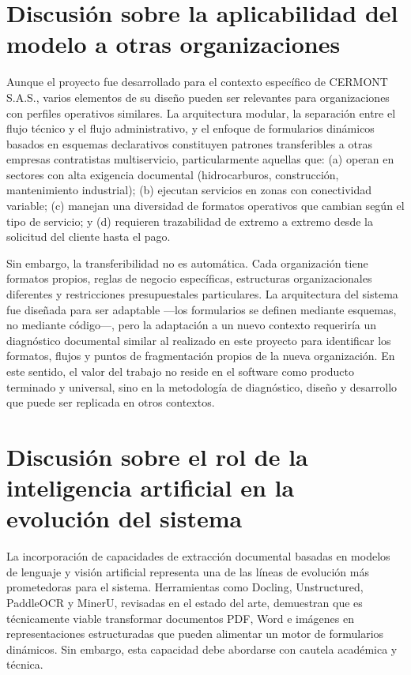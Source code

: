 \section{Discusión sobre la aplicabilidad del modelo a otras organizaciones}
\label{sec:discusion-aplicabilidad}

Aunque el proyecto fue desarrollado para el contexto específico de CERMONT S.A.S., varios elementos de su diseño pueden ser relevantes para organizaciones con perfiles operativos similares. La arquitectura modular, la separación entre el flujo técnico y el flujo administrativo, y el enfoque de formularios dinámicos basados en esquemas declarativos constituyen patrones transferibles a otras empresas contratistas multiservicio, particularmente aquellas que: (a) operan en sectores con alta exigencia documental (hidrocarburos, construcción, mantenimiento industrial); (b) ejecutan servicios en zonas con conectividad variable; (c) manejan una diversidad de formatos operativos que cambian según el tipo de servicio; y (d) requieren trazabilidad de extremo a extremo desde la solicitud del cliente hasta el pago.

Sin embargo, la transferibilidad no es automática. Cada organización tiene formatos propios, reglas de negocio específicas, estructuras organizacionales diferentes y restricciones presupuestales particulares. La arquitectura del sistema fue diseñada para ser adaptable —los formularios se definen mediante esquemas, no mediante código—, pero la adaptación a un nuevo contexto requeriría un diagnóstico documental similar al realizado en este proyecto para identificar los formatos, flujos y puntos de fragmentación propios de la nueva organización. En este sentido, el valor del trabajo no reside en el software como producto terminado y universal, sino en la metodología de diagnóstico, diseño y desarrollo que puede ser replicada en otros contextos.

\section{Discusión sobre el rol de la inteligencia artificial en la evolución del sistema}
\label{sec:discusion-ia}

La incorporación de capacidades de extracción documental basadas en modelos de lenguaje y visión artificial representa una de las líneas de evolución más prometedoras para el sistema. Herramientas como Docling, Unstructured, PaddleOCR y MinerU, revisadas en el estado del arte, demuestran que es técnicamente viable transformar documentos PDF, Word e imágenes en representaciones estructuradas que pueden alimentar un motor de formularios dinámicos. Sin embargo, esta capacidad debe abordarse con cautela académica y técnica.

